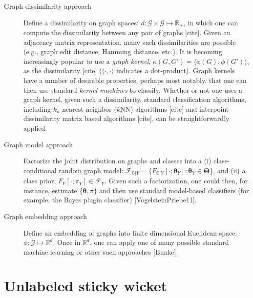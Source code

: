 \documentclass{article} %
\providecommand{\ve}[1]{\boldsymbol{#1}}
\newcommand{\bth}{\ve{\theta}}
\newcommand{\bTh}{\ve{\Theta}}
\providecommand{\mc}[1]{\mathcal{#1}}
\newcommand{\Real}{\mathbb{R}}
\newcommand{\GG}{\mathbb{G}}
\begin{document}
\begin{description}
	\item[Graph dissimilarity approach] Define a dissimilarity on graph spaces: $d: \mc{G} \times \mc{G} \mapsto \Real_+$, in which one can compute the dissimilarity between any pair of graphs [cite]. Given an adjacency matrix representation, many such dissimilarities are possible (e.g., graph edit distance, Hamming distance, etc.).  It is becoming increasingly popular to use a \emph{graph kernel}, $\kappa(G,G')=\langle \phi(G), \phi(G') \rangle$, as the dissimilarity [cite] ($\langle \cdot, \cdot \rangle$ indicates a dot-product).  Graph kernels have a number of desirable properties, perhaps most notably, that one can then use standard \emph{kernel machines} to classify.	Whether or not one uses a graph kernel, given such a dissimilarity, standard classification algorithms, including $k_n$ nearest neighbor ($k$NN) algorithms [cite] and interpoint-dissimilarity matrix based algorithms [cite], can be straightforwardly applied.  
	\item[Graph model approach] Factorize the joint distribution on graphs and classes into a (i) class-conditional random graph model: $\mc{F}_{\GG  | Y} = \{F_{\GG|Y}[\cdot; \bth_Y] : \bth_Y \in \bTh\}$, and (ii) a class prior, $F_Y[\cdot; \pi_Y] \in \mc{F}_Y$.  Given such a factorization, one could then, for instance, estimate $\{\bth,\pi\}$ and then use standard model-based classifiers (for example, the Bayes plugin classifier) [VogelsteinPriebe11]. 
	\item[Graph embedding approach] Define an embedding of graphs into finite dimensional Euclidean space: $\phi: \mc{G} \mapsto \Real^d$.  Once in $\Real^d$, one can apply one of many possible standard machine learning or other such approaches [Bunke]. 
\end{description}



\section{Unlabeled sticky wicket}
\end{document}
